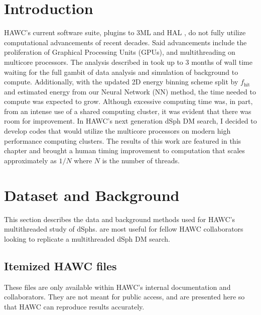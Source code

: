 \section{Introduction}\label{sec:mtd_intro}

HAWC's current software suite, plugins to 3ML and HAL \cite{2021arXiv211201818M,Abeysekara_2017}, do not fully utilize computational advancements of recent decades.
Said advancements include the proliferation of Graphical Processing Units (GPUs), and multithreading on multicore processors.
The analysis described in  took up to 3 months of wall time waiting for the full gambit of data analysis and simulation of background to compute.
Additionally, with the updated 2D energy binning scheme split by $f_\mathrm{hit}$ and estimated energy from our Neural Network (NN) method, the time needed to compute was expected to grow.
Although excessive computing time was, in part, from an intense use of a shared computing cluster, it was evident that there was room for improvement.
In HAWC's next generation dSph DM search, I decided to develop codes that would utilize the multicore processors on modern high performance computing clusters.
The results of this work are featured in this chapter and brought a human timing improvement to computation that scales approximately as $1/N$ where $N$ is the number of threads.

\section{Dataset and Background}\label{sec:mtd_databgd}

This section describes the data and background methods used for HAWC's multithreaded study of dSphs.
 are most useful for fellow HAWC collaborators looking to replicate a multithreaded dSph DM search.

\subsection{Itemized HAWC files}\label{sec:mtd_data}
These files are only available within HAWC's internal documentation and collaborators.
They are not meant for public access, and are presented here so that HAWC can reproduce results accurately.

